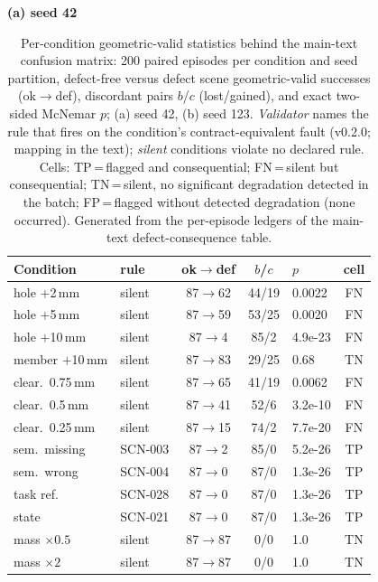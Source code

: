 \begin{table}[H]
\centering
\caption{Per-condition geometric-valid statistics behind
the main-text confusion matrix: 200 paired episodes per condition and seed
partition, defect-free versus defect scene geometric-valid successes
(ok${\rightarrow}$def), discordant pairs $b$/$c$ (lost/gained), and exact
two-sided McNemar $p$; (a) seed 42, (b) seed 123. \emph{Validator} names the
rule that fires on the condition's contract-equivalent fault (v0.2.0;
mapping in the text); \emph{silent} conditions violate no declared rule.
Cells: TP\,=\,flagged and consequential; FN\,=\,silent but consequential;
TN\,=\,silent, no significant degradation detected in the batch;
FP\,=\,flagged without detected degradation (none occurred). Generated from
the per-episode ledgers of the main-text defect-consequence table.}
\label{tab:geo-condition-stats}
\scriptsize
\setlength{\tabcolsep}{2.5pt}
\textbf{(a) seed 42}\\[2pt]
\begin{tabular}{ll ccl c}
\toprule
Condition & rule & ok${\rightarrow}$def & $b$/$c$ & $p$ & cell \\
\midrule
hole $+$2\,mm & silent & 87$\rightarrow$62 & 44/19 & 0.0022 & FN \\
hole $+$5\,mm & silent & 87$\rightarrow$59 & 53/25 & 0.0020 & FN \\
hole $+$10\,mm & silent & 87$\rightarrow$4 & 85/2 & 4.9e-23 & FN \\
member $+$10\,mm & silent & 87$\rightarrow$83 & 29/25 & 0.68 & TN \\
clear.\ 0.75\,mm & silent & 87$\rightarrow$65 & 41/19 & 0.0062 & FN \\
clear.\ 0.5\,mm & silent & 87$\rightarrow$41 & 52/6 & 3.2e-10 & FN \\
clear.\ 0.25\,mm & silent & 87$\rightarrow$15 & 74/2 & 7.7e-20 & FN \\
sem.\ missing & SCN-003 & 87$\rightarrow$2 & 85/0 & 5.2e-26 & TP \\
sem.\ wrong & SCN-004 & 87$\rightarrow$0 & 87/0 & 1.3e-26 & TP \\
task ref. & SCN-028 & 87$\rightarrow$0 & 87/0 & 1.3e-26 & TP \\
state & SCN-021 & 87$\rightarrow$0 & 87/0 & 1.3e-26 & TP \\
mass $\times0.5$ & silent & 87$\rightarrow$87 & 0/0 & 1.0 & TN \\
mass $\times2$ & silent & 87$\rightarrow$87 & 0/0 & 1.0 & TN \\
\bottomrule
\end{tabular}\\[6pt]

\end{table}
